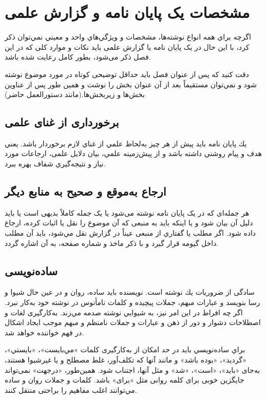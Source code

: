 \chapter{مشخصات یک پایان نامه و گزارش علمی}

اگرچه براي همه انواع نوشته‌ها، مشخصات و ويژگي‌هاي واحد و معيني نمي‌توان ذكر كرد، با اين حال در یک پایان نامه یا گزارش علمی باید نکات و موارد کلی که در این فصل ذکر می‌شود، بطور کامل رعایت شده باشد. 

دقت كنيد كه پس از عنوان فصل بايد حداقل توضیحی کوتاه در مورد موضوع نوشته شود و نمي‌توان مستقيماً بعد از آن عنوان بخش را نوشت و همين طور پس از عناوين بخش‌ها و زيربخش‌ها.(مانند دستورالعمل حاضر)
\section{برخورداری از غنای علمی }

يك پایان نامه بايد پیش از هر چيز به‌لحاظ علمي از غناي لازم برخوردار باشد. يعني هدف و پيام روشني داشته باشد و از پيش‌زمينه علمي، بيان دلايل علمی، ارجاعات مورد نیاز و نتيجه‌گيري شفاف بهره ببرد. 

\section{ارجاع به‌موقع و صحیح به منابع دیگر}
هر جمله‌ای که در یک پایان نامه نوشته می‌شود یا یک جمله کاملاً بدیهی است یا باید دلیل آن بیان شود و یا اینکه باید به منبعی که آن موضوع را نقل یا اثبات کرده، ارجاع داده شود. اگر مطلب يا گفتاري از منبعی عيناً در گزارش نقل مي‌شود، بايد آن مطلب داخل گيومه قرار گيرد و با ذكر ماخذ و شماره صفحه، به آن اشاره گردد.


\section{ساده‌نویسی }
سادگی از ضروريات يك نوشته است. نويسنده بايد ساده، روان و در عين حال شيوا و رسا بنويسد و عبارات مبهم، جملات پيچيده و كلمات نامأنوس در نوشته خود به‌كار نبرد. اگر چه افراط در اين امر نيز، به شيوايي نوشته صدمه مي‌زند. به‌كارگیری لغات و اصطلاحات دشوار و دور از ذهن و عبارات و جملات نامنظم و مبهم موجب ايجاد اشكال در فهم خواننده خواهد شد‌. 

 براي ساده‌نويسي بايد در حد امكان از به‌كارگيری كلمات «مي‌بايست»، «بايستي»، «گرديد»، «بوده باشد» و مانند آنها كه تكلف‌آور، غلط مصطلح و يا غيرشيوا هستند، به‌جای «بايد»، «است»، «شد» و مثل آنها، اجتناب شود‌.‌ همين‌طور، «در‌جهت» نمی‌تواند جايگزين خوبی برای كلمه روانی مثل «برای» باشد‌. ‌كلمات و جملات روان و ساده مي‌توانند اغلب مفاهيم را براحتی منتقل كنند‌.‌
 
